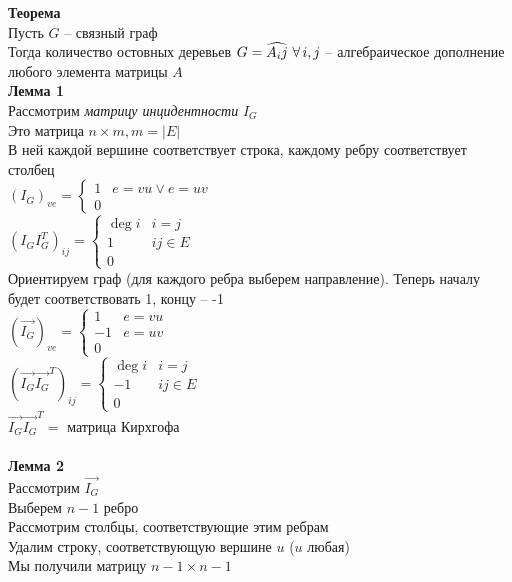 \documentclass[12pt]{article}
\begin{document}
\textbf{Теорема}\\
Пусть $G$ -- связный граф\\
Тогда количество остовных деревьев $G = \widehat{A_ij}\ \forall\, i,j$ -- алгебраическое дополнение любого элемента матрицы $A$\\
\textbf{Лемма 1}\\
Рассмотрим \textit{матрицу инцидентности} $I_G$\\
Это матрица $n\times m, m = |E|$\\
В ней каждой вершине соответствует строка, каждому ребру соответствует столбец\\
$(I_G)_{ve} = \left\{\begin{array}{cc}
    1 & e = vu \lor e = uv\\
    0 & 
\end{array}\right.$\\
$(I_G I_G^T)_{ij} = \left\{\begin{array}{cc}
    \deg i & i = j\\
    1 & ij\in E\\
    0 & 
\end{array}\right.$\\
Ориентируем граф (для каждого ребра выберем направление). Теперь началу будет соответствовать 1, концу -- -1\\
$(\overrightarrow{I_G})_{ve} = \left\{\begin{array}{cc}
    1 & e = vu\\
    -1 & e = uv\\
    0 & 
\end{array}\right.$\\
$(\overrightarrow{I_G} \overrightarrow{I_G}^T)_{ij} = \left\{\begin{array}{cc}
    \deg i & i = j\\
    -1 & ij\in E\\
    0 & 
\end{array}\right.$\\
$\overrightarrow{I_G} \overrightarrow{I_G}^T =$ матрица Кирхгофа\\\\
\textbf{Лемма 2}\\
Рассмотрим $\overrightarrow{I_G}$\\
Выберем $n-1$ ребро\\
Рассмотрим столбцы, соответствующие этим ребрам\\
Удалим строку, соответствующую вершине $u$ ($u$ любая)\\
Мы получили матрицу $n-1\times n-1$\\
\end{document}
